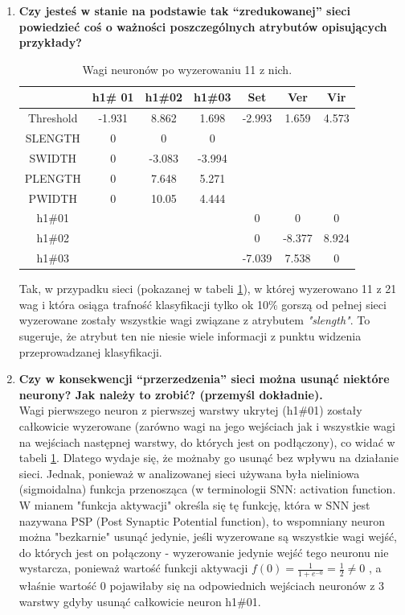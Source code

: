 \begin{enumerate}
\item \textbf{
Czy jesteś w stanie na podstawie tak “zredukowanej” sieci powiedzieć coś o ważności poszczególnych atrybutów opisujących przykłady?}

\begin{table}[ch]
	\centering
	\caption{Wagi neuronów po wyzerowaniu 11 z nich.\label{tab:zeroweights}}
	\begin{tabular}{|c|c|c|c|c|c|c|}
		\hline  & h1\# 01 & h1\#02 & h1\#03 & Set & Ver & Vir \\
		\hline Threshold & -1.931 & 8.862 & 1.698 & -2.993 & 1.659 & 4.573 \\
		\hline SLENGTH & 0 & 0 & 0 &  &  & \\
		\hline SWIDTH & 0 & -3.083 & -3.994 &  &  &  \\
		\hline PLENGTH & 0 & 7.648 & 5.271 &  &  &  \\
		\hline PWIDTH & 0 & 10.05 & 4.444 &  &  &  \\
		\hline h1\#01 &  &  &  & 0 & 0 & 0\\
		\hline h1\#02 &  &  &  & 0 & -8.377 & 8.924 \\
		\hline h1\#03 &  &  &  & -7.039 & 7.538 & 0 \\
		\hline
	\end{tabular}
\end{table}


Tak, w przypadku sieci (pokazanej w tabeli \ref{tab:zeroweights}), w której wyzerowano 11 z 21 wag i która osiąga trafność klasyfikacji tylko ok 10\% gorszą od pełnej sieci wyzerowane zostały wszystkie wagi związane z atrybutem \emph{"slength"}. To sugeruje, że atrybut ten nie niesie wiele informacji z punktu widzenia przeprowadzanej klasyfikacji.

\item \textbf{
Czy w konsekwencji “przerzedzenia” sieci można usunąć niektóre neurony? Jak należy to zrobić?
 (przemyśl dokładnie).}
 \\Wagi pierwszego neuron z pierwszej warstwy ukrytej (h1\#01) zostały całkowicie wyzerowane (zarówno wagi na jego wejściach jak i wszystkie wagi na wejściach następnej warstwy, do których jest on podłączony), co widać w tabeli \ref{tab:zeroweights}. Dlatego wydaje się, że możnaby go usunąć bez wpływu na działanie sieci. Jednak, ponieważ w analizowanej sieci używana była nieliniowa (sigmoidalna) funkcja przenosząca (w terminologii SNN: activation function. W \cite{umisn} mianem "funkcja aktywacji" określa się tę funkcję, która w SNN jest nazywana PSP (Post Synaptic Potential function), to wspomniany neuron można "bezkarnie" usunąć jedynie, jeśli wyzerowane są wszystkie wagi wejść, do których jest on połączony - wyzerowanie jedynie wejść tego neuronu nie wystarcza, ponieważ wartość funkcji aktywacji $ f(0) = \frac{1}{1 + e^{-0}} = \frac{1}{2} \neq 0 $ , a właśnie wartość 0 pojawiłaby się na odpowiednich wejściach neuronów z 3 warstwy gdyby usunąć całkowicie neuron h1\#01.
\end{enumerate}

